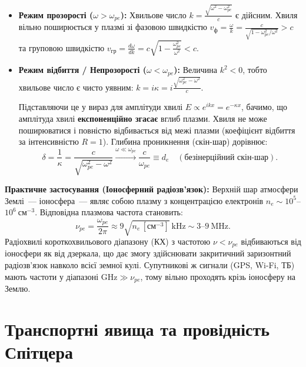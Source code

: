 \begin{itemize}
	\item \textbf{Режим прозорості ($\omega > \omega_{pe}$):}
	Хвильове число $k = \frac{\sqrt{\omega^2 - \omega_{pe}^2}}{c}$ є дійсним. Хвиля вільно поширюється у плазмі зі фазовою швидкістю $v_{\text{ф}} = \frac{\omega}{k} = \frac{c}{\sqrt{1 - \omega_{pe}^2/\omega^2}} > c$ та груповою швидкістю $v_{\text{гр}} = \frac{d\omega}{dk} = c\sqrt{1 - \frac{\omega_{pe}^2}{\omega^2}} < c$.

	\item \textbf{Режим відбиття / Непрозорості ($\omega < \omega_{pe}$):}
	Величина $k^2 < 0$, тобто хвильове число є чисто уявним: $k = i\kappa = i\frac{\sqrt{\omega_{pe}^2 - \omega^2}}{c}$.

	Підставляючи це у вираз для амплітуди хвилі $E \propto e^{i k x} = e^{-\kappa x}$, бачимо, що амплітуда хвилі \textbf{експоненційно згасає} вглиб плазми. Хвиля не може поширюватися і повністю відбивається від межі плазми (коефіцієнт відбиття за інтенсивністю $R = 1$). Глибина проникнення (скін-шар) дорівнює:
	\begin{equation}
		\delta = \frac{1}{\kappa} = \frac{c}{\sqrt{\omega_{pe}^2 - \omega^2}} \xrightarrow{\omega \ll \omega_{pe}} \frac{c}{\omega_{pe}} \equiv d_e \quad (\text{безінерційний скін-шар}).
	\end{equation}
\end{itemize}

\textbf{Практичне застосування (Іоносферний радіозв'язок):}
Верхній шар атмосфери Землі~--- іоносфера~--- являє собою плазму з концентрацією електронів $n_e \sim 10^5$--$10^6~\mathrm{см}^{-3}$. Відповідна плазмова частота становить:
\begin{equation}
	\nu_{pe} = \frac{\omega_{pe}}{2\pi} \approx 9\sqrt{n_e\,[\mathrm{см}^{-3}]}~\mathrm{kHz} \sim 3\text{--}9~\mathrm{MHz}.
\end{equation}
Радіохвилі короткохвильового діапазону (КХ) з частотою $\nu < \nu_{pe}$ відбиваються від іоносфери як від дзеркала, що дає змогу здійснювати закритичний заризонтний радіозв'язок навколо всієї земної кулі. Супутникові ж сигнали (GPS, Wi-Fi, ТБ) мають частоти у діапазоні $\mathrm{GHz} \gg \nu_{pe}$, тому вільно проходять крізь іоносферу на Землю.

\section{Транспортні явища та провідність Спітцера}\label{sec:transport}

